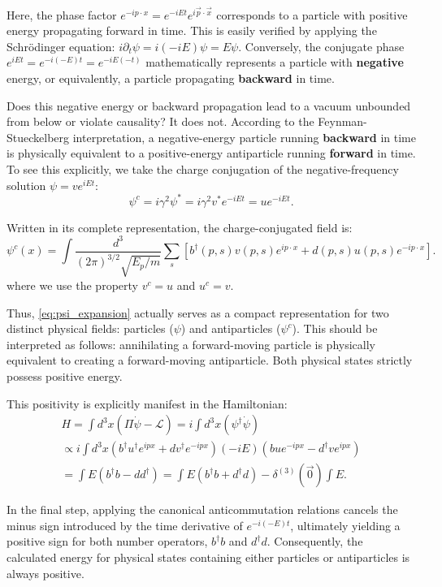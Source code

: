 Here, the phase factor $e^{-ip\cdot x}=e^{-iEt}e^{i\vec{p}\cdot\vec{x}}$ corresponds to a particle with positive energy propagating forward in time. This is easily verified by applying the Schrödinger equation: $i\partial_t \psi=i(-iE)\psi=E\psi$. Conversely, the conjugate phase $e^{iEt}=e^{-i(-E)t}=e^{-iE(-t)}$ mathematically represents a particle with \textbf{negative} energy, or equivalently, a particle propagating \textbf{backward} in time. 

Does this negative energy or backward propagation lead to a vacuum unbounded from below or violate causality? It does not. According to the Feynman-Stueckelberg interpretation, a negative-energy particle running \textbf{backward} in time is physically equivalent to a positive-energy antiparticle running \textbf{forward} in time. To see this explicitly, we take the charge conjugation of the negative-frequency solution $\psi=v e^{iEt}$: 
\[\psi^c=i\gamma^2 \psi^*=i\gamma^2 v^*e^{-iEt}=ue^{-iEt}.\]

Written in its complete representation, the charge-conjugated field is: 
\begin{equation}\label{eq:psic_expansion}
    \psi^c(x)=\int \frac{d^3}{(2\pi)^{3/2}\sqrt{E_p/m}} \sum_s [b^\dagger(p,s)v(p,s)e^{ip \cdot x}+d(p,s)u(p,s)e^{-ip\cdot x}].
\end{equation}
where we use the property $v^c=u$ and $u^c=v$.

Thus, \cref{eq:psi_expansion} actually serves as a compact representation for two distinct physical fields: particles ($\psi$) and antiparticles ($\psi^c$). This should be interpreted as follows: annihilating a forward-moving particle is physically equivalent to creating a forward-moving antiparticle. Both physical states strictly possess positive energy. 

This positivity is explicitly manifest in the Hamiltonian: 
\begin{equation}
\begin{aligned}
H=\int d^3x(\Pi\dot\psi-\mathcal{L})=i\int d^3x(\psi^\dagger\dot\psi)\\
\propto i\int d^3x (b^\dagger u^\dagger e^{ipx}+dv^\dagger e^{-ipx})(-iE)(bu e^{-ipx}-d^\dagger v e^{ipx})\\
=\int E (b^\dagger b-dd^\dagger)=\int E(b^\dagger b+d^\dagger d)-\delta^{(3)}(\vec{0})\int E.
\end{aligned}
\end{equation}

In the final step, applying the canonical anticommutation relations cancels the minus sign introduced by the time derivative of $e^{-i(-E)t}$, ultimately yielding a positive sign for both number operators, $b^\dagger b$ and $d^\dagger d$. Consequently, the calculated energy for physical states containing either particles or antiparticles is always positive.

